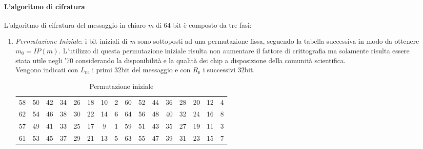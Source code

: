 \documentclass[11pt, a4paper, oneside]{Thesis} %
\begin{document}
\paragraph{L'algoritmo di cifratura} L'algoritmo di cifratura del messaggio in chiaro \emph{m} di 64 bit è composto da tre fasi:
\begin{enumerate}
 \item \textit{Permutazione Iniziale}: i bit iniziali di \emph{m} sono sottoposti ad una permutazione fissa, seguendo la tabella successiva in modo da ottenere $ m_0 = IP(m) $.
 L'utilizzo di questa permutazione iniziale risulta non aumentare il fattore di crittografia ma solamente risulta essere stata utile negli '70 considerando la disponibilità e la
 qualità dei chip a disposizione della comunità scientifica.
 \\Vengono indicati con $L_0$, i primi 32bit del messaggio e con $R_0$ i successivi 32bit.
      \begin{table}[ht] 
      \caption{Permutazione iniziale} %
      \centering %
      \begin{tabular}{c c c c c c c c c c c c c c c c} %
      \hline %
      58 & 50 & 42 & 34 & 26 & 18 & 10 & 2 & 60 & 52 & 44 & 36 & 28 & 20 & 12 & 4 \\
      62 & 54 & 46 & 38 & 30 & 22 & 14 & 6 & 64 & 56 & 48 & 40 & 32 & 24 & 16 & 8 \\
      57 & 49 & 41 & 33 & 25 & 17 &  9 & 1 & 59 & 51 & 43 & 35 & 27 & 19 & 11 & 3 \\
      61 & 53 & 45 & 37 & 29 & 21 & 13 & 5 & 63 & 55 & 47 & 39 & 31 & 23 & 15 & 7 \\
      \hline %
      \end{tabular} 
      \label{table:tabPermIniz} %
      \end{table}


\end{enumerate}
\end{document}
